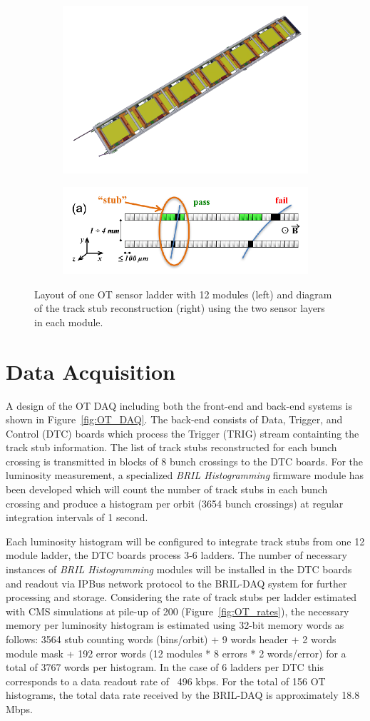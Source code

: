 \begin{figure}[hbtp]
\centering
\begin{subfigure}
  \centering
  \includegraphics[width=.48\linewidth]{tex/Part2/fig/OT/OT-ladder.png}
\end{subfigure}
\begin{subfigure}
  \centering
  \includegraphics[width=.48\linewidth]{tex/Part2/fig/OT/OT-stub.png}
\end{subfigure}
\caption{
  Layout of one OT sensor ladder with 12 modules (left) and diagram of the track stub reconstruction (right) using the two sensor layers in each module.  
}
\label{fig:OT_ladder_stub}
\end{figure}


\section{Data Acquisition}

A design of the OT DAQ including both the front-end and back-end systems is shown in Figure~\ref{fig:OT_DAQ}.
The back-end consists of Data, Trigger, and Control (DTC) boards which process the Trigger (TRIG) stream containting the track stub information. 
The list of track stubs reconstructed for each bunch crossing is transmitted in blocks of 8 bunch crossings to the DTC boards.
For the luminosity measurement, a specialized {\it BRIL Histogramming} firmware module has been developed which will count the number of track stubs in each bunch crossing and produce a histogram per orbit (3654 bunch crossings) at regular integration intervals of 1 second.

Each luminosity histogram will be configured to integrate track stubs from one 12 module ladder, the DTC boards process 3-6 ladders.
The number of necessary instances of  {\it BRIL Histogramming} modules will be installed in the DTC boards and readout via IPBus network protocol to the BRIL-DAQ system for further processing and storage.
Considering the rate of track stubs per ladder estimated with CMS simulations at pile-up of 200  (Figure~\ref{fig:OT_rates}),  the necessary memory per luminosity histogram is estimated using 32-bit memory words as follows: 3564 stub counting words (bins/orbit) + 9 words header + 2 words module mask + 192 error words (12 modules * 8 errors * 2 words/error) for a total of 3767 words per histogram.
In the case of 6 ladders per DTC this corresponds to a data readout rate of ~496 kbps.
For the total of 156 OT histograms, the total data rate received by the BRIL-DAQ is approximately 18.8 Mbps.

